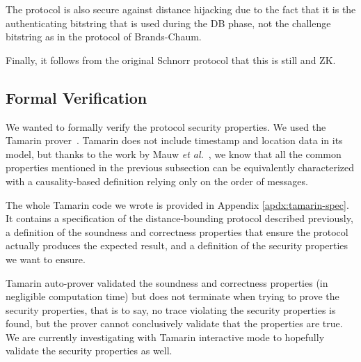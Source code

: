The protocol is also secure against distance hijacking due to the fact
that it is the authenticating bitstring that is used during the \ac{DB}
phase, not the challenge bitstring as in the protocol of Brands-Chaum.

Finally, it follows from the original Schnorr protocol that this is still 
 and \ac{ZK}.

\subsection{Formal Verification}

We wanted to formally verify the protocol security properties. We used the Tamarin prover~\cite{meier2013tamarin}. Tamarin does not include timestamp and location data in its model, but thanks to the work by Mauw \emph{et al.}~\cite{TamarinDB}, we know that all the common properties mentioned in the previous subsection can be equivalently characterized with a causality-based definition relying only on the order of messages.

The whole Tamarin code we wrote is provided in Appendix \ref{apdx:tamarin-spec}. It contains a specification of the distance-bounding protocol described previously, a definition of the soundness and correctness properties that ensure the protocol actually produces the expected result, and a definition of the security properties we want to ensure.

Tamarin auto-prover validated the soundness and correctness properties (in negligible computation time) but does not terminate when trying to prove the security properties, that is to say, no trace violating the security properties is found, but the prover cannot conclusively validate that the properties are true. We are currently investigating with Tamarin interactive mode to hopefully validate the security properties as well.

